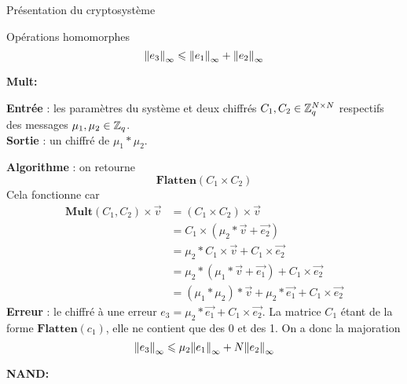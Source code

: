 \begin{section}{Présentation du cryptosystème}
\begin{subsection}{Opérations homomorphes}
\[{\|e_3\|}_{\infty} \leqslant {\|e_1\|}_{\infty} + {\|e_2\|}_{\infty}\] 


\begin{samepage}
\vspace{0.5cm}\noindent\textbf{Mult:}
\flushleft
	
	\textbf{Entrée} : les paramètres du système et deux chiffrés $C_1, C_2 \in \mathbb{Z}_q^{N \times N}$ respectifs des messages $\mu_1, \mu_2 \in \mathbb{Z}_q$.\\
	\textbf{Sortie} : un chiffré de $\mu_1 * \mu_2$. \\
\end{samepage}
	\textbf{Algorithme} : on retourne \[\textbf{Flatten}(C_1 \times C_2)\]
	Cela fonctionne car
	\begin{align*}
	\textbf{Mult}(C_1, C_2) \times \vec{v} &= (C_1 \times C_2) \times \vec{v} \\
	&= C_1 \times (\mu_2 * \vec{v} + \vec{e_2}) \\
	&= \mu_2 * C_1 \times \vec{v} + C_1 \times \vec{e_2} \\
	&= \mu_2 * (\mu_1 * \vec{v} + \vec{e_1}) + C_1 \times \vec{e_2} \\
	&= (\mu_1 * \mu_2) * \vec{v} + \mu_2 * \vec{e_1} + C_1 \times \vec{e_2}
	\end{align*}
	\textbf{Erreur} : le chiffré à une erreur $e_3 = \mu_2 * \vec{e_1} + C_1 \times \vec{e_2}$. La matrice $C_1$ étant de la forme $\textbf{Flatten}(c_1)$, elle ne contient que des 0 et des 1. 
	On a donc la majoration
\[{\|e_3\|}_{\infty} \leqslant \mu_2 {\|e_1\|}_{\infty} + N {\|e_2\|}_{\infty} \]

\vspace{0.5cm}\noindent\textbf{NAND:}
\flushleft
	

\end{subsection}
\end{section}
